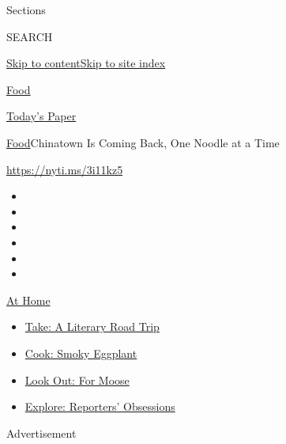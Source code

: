 Sections

SEARCH

\protect\hyperlink{site-content}{Skip to
content}\protect\hyperlink{site-index}{Skip to site index}

\href{https://www.nytimes.com/section/food}{Food}

\href{https://myaccount.nytimes.com/auth/login?response_type=cookie\&client_id=vi}{}

\href{https://www.nytimes.com/section/todayspaper}{Today's Paper}

\href{/section/food}{Food}\textbar{}Chinatown Is Coming Back, One Noodle
at a Time

\url{https://nyti.ms/3i11kz5}

\begin{itemize}
\item
\item
\item
\item
\item
\item
\end{itemize}

\href{https://www.nytimes.com/spotlight/at-home?action=click\&pgtype=Article\&state=default\&region=TOP_BANNER\&context=at_home_menu}{At
Home}

\begin{itemize}
\tightlist
\item
  \href{https://www.nytimes.com/2020/07/28/books/time-for-a-literary-road-trip.html?action=click\&pgtype=Article\&state=default\&region=TOP_BANNER\&context=at_home_menu}{Take:
  A Literary Road Trip}
\item
  \href{https://www.nytimes.com/2020/07/29/magazine/bored-with-your-home-cooking-some-smoky-eggplant-will-fix-that.html?action=click\&pgtype=Article\&state=default\&region=TOP_BANNER\&context=at_home_menu}{Cook:
  Smoky Eggplant}
\item
  \href{https://www.nytimes.com/2020/07/27/travel/moose-michigan-isle-royale.html?action=click\&pgtype=Article\&state=default\&region=TOP_BANNER\&context=at_home_menu}{Look
  Out: For Moose}
\item
  \href{https://www.nytimes.com/interactive/2020/at-home/even-more-reporters-editors-diaries-lists-recommendations.html?action=click\&pgtype=Article\&state=default\&region=TOP_BANNER\&context=at_home_menu}{Explore:
  Reporters' Obsessions}
\end{itemize}

Advertisement

